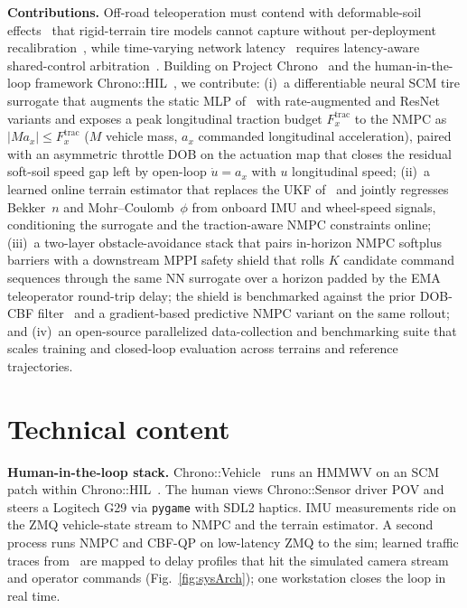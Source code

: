 \documentclass{acmd2026_abstract}
\begin{document}
\vspace{2pt}
\noindent\textbf{Contributions.}  Off-road
teleoperation must contend with deformable-soil effects~\cite{Bekker69}
that rigid-terrain tire models cannot capture without per-deployment
recalibration~\cite{Dallas21}, while time-varying network
latency~\cite{Choi23} requires latency-aware shared-control
arbitration~\cite{Zhang25}.  Building on Project Chrono~\cite{Tasora16} and
the human-in-the-loop framework Chrono::HIL~\cite{Zhou23}, we contribute: (i)~a differentiable
neural SCM tire surrogate that augments the static MLP
of~\cite{Dallas21} with rate-augmented and ResNet variants and
exposes a peak longitudinal traction budget $F_x^{\mathrm{trac}}$
to the NMPC as $|M a_x|\!\le\!F_x^{\mathrm{trac}}$ ($M$ vehicle
mass, $a_x$ commanded longitudinal acceleration), paired with an
asymmetric throttle DOB on the actuation map that closes the
residual soft-soil speed gap left by open-loop $\dot u\!=\!a_x$
with $u$ longitudinal speed;
(ii)~a learned online terrain estimator that
replaces the UKF of~\cite{Dallas21} and jointly regresses
Bekker~$n$ and Mohr--Coulomb~$\phi$ from onboard IMU and
wheel-speed signals, conditioning the surrogate and the
traction-aware NMPC constraints online; (iii)~a two-layer obstacle-avoidance
stack that pairs in-horizon NMPC softplus barriers with a
downstream MPPI safety shield that rolls $K$ candidate command
sequences through the same NN surrogate over a horizon padded by
the EMA teleoperator round-trip delay; the shield is benchmarked
against the prior DOB-CBF filter~\cite{Zhang25} and a
gradient-based predictive NMPC variant on the same rollout; and
(iv)~an open-source parallelized data-collection and benchmarking
suite that scales training and closed-loop evaluation across
terrains and reference trajectories.

\section*{Technical content}
\vspace{-4pt}

\noindent\textbf{Human-in-the-loop stack.}  Chrono::Vehicle~\cite{Serban19}
runs an HMMWV on an SCM patch within Chrono::HIL~\cite{Zhou23}.
The human views Chrono::Sensor driver POV and steers a Logitech G29
via \texttt{pygame} with SDL2 haptics.  IMU measurements ride on the
ZMQ vehicle-state stream to NMPC and the terrain estimator.  A second
process runs NMPC and CBF-QP on low-latency ZMQ to the sim; learned
traffic traces from~\cite{Choi23} are mapped to delay profiles that
hit the simulated camera stream and operator commands
(Fig.~\ref{fig:sysArch}); one workstation closes the loop in real
time.
\end{document}
